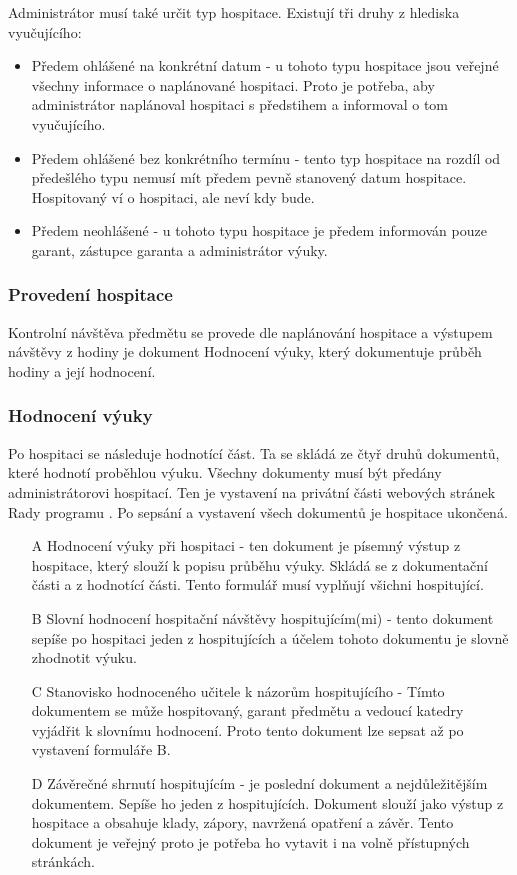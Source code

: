 Administrátor musí také určit typ hospitace. Existují tři druhy z hlediska vyučujícího:

\begin{itemize}
\item Předem ohlášené na konkrétní datum - u tohoto typu hospitace jsou veřejné všechny informace o naplánované hospitaci. Proto je potřeba, aby administrátor naplánoval hospitaci s předstihem a informoval o tom vyučujícího.
\item Předem ohlášené bez konkrétního termínu - tento typ hospitace na rozdíl od předešlého typu nemusí mít předem pevně stanovený datum hospitace. Hospitovaný  ví o hospitaci, ale neví kdy bude.
\item Předem neohlášené - u tohoto typu hospitace je předem informován pouze garant, zástupce garanta a administrátor výuky. 

\end{itemize}

\subsubsection{Provedení hospitace}
Kontrolní návštěva předmětu se provede dle naplánování hospitace a výstupem návštěvy z hodiny je dokument Hodnocení výuky, který dokumentuje průběh hodiny a její hodnocení. 

\subsubsection{Hodnocení výuky}
Po hospitaci se následuje hodnotící část. Ta se skládá ze čtyř druhů dokumentů, které hodnotí proběhlou výuku. Všechny dokumenty musí být předány administrátorovi hospitací. Ten je vystavení na privátní části webových stránek Rady programu \cite{kvalitavyukyweb}. Po sepsání a vystavení všech dokumentů je hospitace ukončená. 

\begin{itemize}
\item[A] Hodnocení výuky při hospitaci - ten dokument  je písemný výstup z hospitace, který slouží k popisu průběhu výuky. Skládá se z dokumentační části a z hodnotící části. Tento formulář musí vyplňují všichni hospitující.
\item[B] Slovní hodnocení hospitační návštěvy hospitujícím(mi) - tento dokument sepíše po hospitaci jeden z hospitujících a účelem tohoto dokumentu je slovně zhodnotit výuku. 
\item[C] Stanovisko hodnoceného učitele k názorům hospitujícího - Tímto dokumentem se může hospitovaný, garant předmětu a vedoucí katedry vyjádřit k slovnímu hodnocení. Proto tento dokument lze sepsat až po vystavení formuláře B.
\item[D] Závěrečné shrnutí hospitujícím - je poslední dokument a nejdůležitějším dokumentem. Sepíše ho jeden z hospitujících. Dokument slouží jako výstup z hospitace a obsahuje klady, zápory, navržená opatření a závěr. Tento dokument je veřejný proto je potřeba ho vytavit i na volně přístupných stránkách.
\end{itemize}